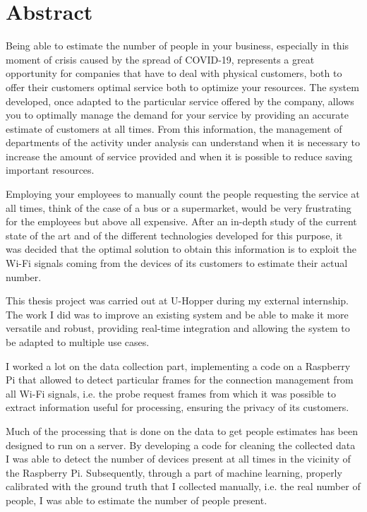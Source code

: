 \chapter*{Abstract} %
\label{abstract}

\vspace{0.4 cm} 

Being able to estimate the number of people in your business, especially in this moment of crisis caused by the spread of COVID-19, represents a great opportunity for companies that have to deal with physical customers, both to offer their customers optimal service both to optimize your resources. The system developed, once adapted to the particular service offered by the company, allows you to optimally manage the demand for your service by providing an accurate estimate of customers at all times. From this information, the management of departments of the activity under analysis can understand when it is necessary to increase the amount of service provided and when it is possible to reduce saving important resources.

Employing your employees to manually count the people requesting the service at all times, think of the case of a bus or a supermarket, would be very frustrating for the employees but above all expensive. After an in-depth study of the current state of the art and of the different technologies developed for this purpose, it was decided that the optimal solution to obtain this information is to exploit the Wi-Fi signals coming from the devices of its customers to estimate their actual number.

This thesis project was carried out at U-Hopper during my external internship. The work I did was to improve an existing system and be able to make it more versatile and robust, providing real-time integration and allowing the system to be adapted to multiple use cases.

I worked a lot on the data collection part, implementing a code on a Raspberry Pi that allowed to detect particular frames for the connection management from all Wi-Fi signals, i.e. the probe request frames from which it was possible to extract information useful for processing, ensuring the privacy of its customers.

Much of the processing that is done on the data to get people estimates has been designed to run on a server. By developing a code for cleaning the collected data I was able to detect the number of devices present at all times in the vicinity of the Raspberry Pi. Subsequently, through a part of machine learning, properly calibrated with the ground truth that I collected manually, i.e. the real number of people, I was able to estimate the number of people present.

